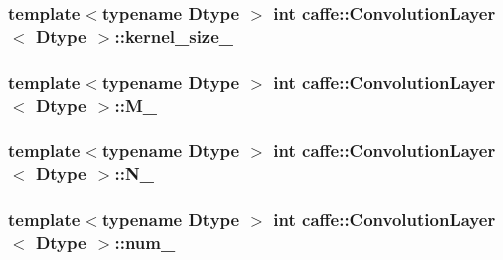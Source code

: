 \hypertarget{classcaffe_1_1_convolution_layer_aa1ca915eb8f781f4b168aaf21f39894b}{
\subsubsection[{kernel\+\_\+size\+\_\+}]{\setlength{\rightskip}{0pt plus 5cm}template$<$typename Dtype $>$ int {\bf caffe\+::\+Convolution\+Layer}$<$ Dtype $>$\+::kernel\+\_\+size\+\_\+\hspace{0.3cm}{\ttfamily [protected]}}}\label{classcaffe_1_1_convolution_layer_aa1ca915eb8f781f4b168aaf21f39894b}
\hypertarget{classcaffe_1_1_convolution_layer_a6a5386d7cc7b6b53653cdc9d17925116}{
\subsubsection[{M\+\_\+}]{\setlength{\rightskip}{0pt plus 5cm}template$<$typename Dtype $>$ int {\bf caffe\+::\+Convolution\+Layer}$<$ Dtype $>$\+::M\+\_\+\hspace{0.3cm}{\ttfamily [protected]}}}\label{classcaffe_1_1_convolution_layer_a6a5386d7cc7b6b53653cdc9d17925116}
\hypertarget{classcaffe_1_1_convolution_layer_ad10263fbb69959ac83dee14deadc5f61}{
\subsubsection[{N\+\_\+}]{\setlength{\rightskip}{0pt plus 5cm}template$<$typename Dtype $>$ int {\bf caffe\+::\+Convolution\+Layer}$<$ Dtype $>$\+::N\+\_\+\hspace{0.3cm}{\ttfamily [protected]}}}\label{classcaffe_1_1_convolution_layer_ad10263fbb69959ac83dee14deadc5f61}
\hypertarget{classcaffe_1_1_convolution_layer_a6976c8be8d083e9ebe44756b5bc6479b}{
\subsubsection[{num\+\_\+}]{\setlength{\rightskip}{0pt plus 5cm}template$<$typename Dtype $>$ int {\bf caffe\+::\+Convolution\+Layer}$<$ Dtype $>$\+::num\+\_\+\hspace{0.3cm}{\ttfamily [protected]}}}\label{classcaffe_1_1_convolution_layer_a6976c8be8d083e9ebe44756b5bc6479b}
